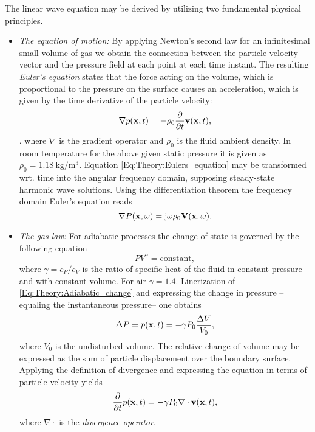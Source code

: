 The linear wave equation may be derived by utilizing two fundamental physical principles.
\begin{itemize}
\item \emph{The equation of motion:} By applying Newton's second law for an infinitesimal small volume of gas we obtain the connection between the particle velocity vector and the pressure field at each point at each time instant. The resulting \emph{Euler's equation} states that the force acting on the volume, which is proportional to the pressure on the surface causes an acceleration, which is given by the time derivative of the particle velocity:
\begin{equation}
\nabla p(\mathbf{x},t) = -\rho_0 \frac{\partial}{\partial t} \mathbf{v}(\mathbf{x},t),
\label{Eq:Theory:Eulers_equation}
\end{equation}
.
%
where $\nabla$ is the gradient operator and $\rho_0$ is the fluid ambient density. In room temperature for the above given static pressure it is given as $\rho_0 = 1.18~\mathrm{kg}/\mathrm{m}^3$.
Equation \eqref{Eq:Theory:Eulers_equation} may be transformed wrt. time into the angular frequency domain, supposing steady-state harmonic wave solutions. Using the differentiation theorem the frequency domain Euler's equation reads
\begin{equation}
\nabla P(\mathbf{x},\omega) = \mathrm{j} \omega \rho_0 \mathbf{V}(\mathbf{x},\omega),
\label{Eq:Theory:Freq_Eulers_equation}
\end{equation}

\item \emph{The gas law:} For adiabatic processes the change of state is governed by the following equation
\begin{equation}
P V^{\gamma} = \mathrm{constant},
\label{Eq:Theory:Adiabatic_change}
\end{equation}
where $\gamma = c_P/c_V$ is the ratio of specific heat of the fluid in constant pressure and with constant volume. For air $\gamma = 1.4$. Linerization of \eqref{Eq:Theory:Adiabatic_change} and expressing the change in pressure --equaling the instantaneous pressure-- one obtains
\begin{equation}
\Delta P = p(\mathbf{x},t) = -\gamma P_0 \frac{\Delta V}{V_0},
\end{equation}
where $V_0$ is the undisturbed volume. The relative change of volume may be expressed as the sum of particle displacement over the boundary surface. Applying the definition of divergence and expressing the equation in terms of particle velocity yields
\begin{equation}
\frac{\partial}{\partial t} p(\mathbf{x},t) = -\gamma P_0 \nabla \cdot \mathbf{v}(\mathbf{x},t),
\label{Eq:Theory:Second_eq}
\end{equation}
where $\nabla \cdot$ is the \emph{divergence operator}.
\end{itemize}
